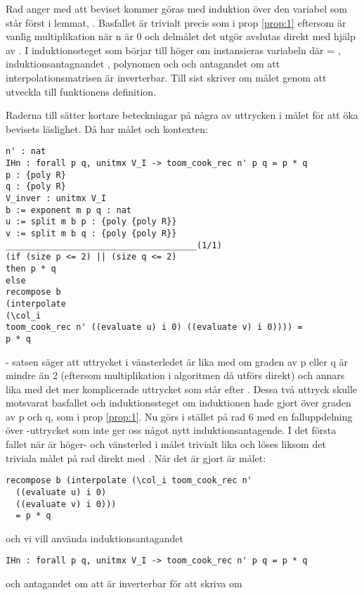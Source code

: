 Rad  anger med  att beviset kommer göras med induktion över den
variabel som står först i lemmat, . Basfallet är trivialt precis som i
prop \ref{prop:1} eftersom  är vanlig multiplikation när n är
0 och delmålet det utgör avslutas direkt med hjälp av \C{//}. I
induktionssteget som börjar till höger om \C{|} instansieras variabeln 
där   = , induktionsantagnandet , polynomen  och
 och antagandet  om att interpolationsmatrisen är inverterbar.
Till sist skriver \C{/=} om målet genom att utveckla  till
funktionens definition.

Raderna  till  sätter kortare beteckningar på några av
uttrycken i målet för att öka bevisets läslighet. Då har målet och kontexten:
\begin{lstlisting}
n' : nat
IHn : forall p q, unitmx V_I -> toom_cook_rec n' p q = p * q
p : {poly R}
q : {poly R}
V_inver : unitmx V_I
b := exponent m p q : nat
u := split m b p : {poly {poly R}}
v := split m b q : {poly {poly R}}
______________________________________(1/1)
(if (size p <= 2) || (size q <= 2)
then p * q
else
recompose b
(interpolate
(\col_i
toom_cook_rec n' ((evaluate u) i 0) ((evaluate v) i 0)))) =
p * q
\end{lstlisting}
 - satsen säger att uttrycket i vänsterledet är lika
med  om graden av p eller q är mindre än 2 (eftersom multiplikation
i algoritmen då utförs direkt) och annars lika med det mer komplicerade
uttrycket som står efter . Dessa två uttryck skulle motsvarat
basfallet och induktionssteget om induktionen hade gjort över graden av p och
q, som i prop \ref{prop:1}. Nu görs i stället på rad 6 med  en
falluppdelning över -uttrycket som inte ger oss
något nytt induktionsantagende. I det första fallet när
 är höger- och vänsterled i målet trivialt
lika och löses liksom det triviala målet på rad  direkt med \C{//}.
När det är gjort är målet:
\begin{lstlisting}
recompose b (interpolate (\col_i toom_cook_rec n'
  ((evaluate u) i 0)
  ((evaluate v) i 0)))
  = p * q
\end{lstlisting}
och vi vill använda induktionsantagandet
\begin{lstlisting}
IHn : forall p q, unitmx V_I -> toom_cook_rec n' p q = p * q
\end{lstlisting}
och antagandet  om att  är inverterbar för att skriva om
